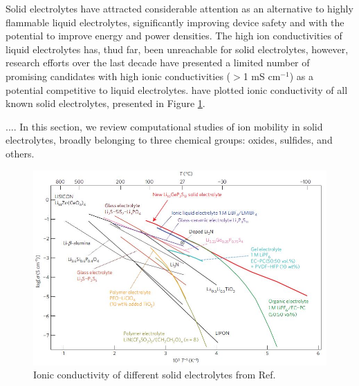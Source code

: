 \documentclass[journal=jacsat,manuscript=article]{achemso}
\begin{document}
Solid electrolytes have attracted considerable attention as an alternative to highly flammable liquid electrolytes, significantly improving device safety and with the potential to improve energy and power densities. \cite{janek_solid_2016, culver_designing_2018, famprikis_fundamentals_2019, goodenough_li-ion_2013} The high ion conductivities of liquid electrolytes has, thud far, been unreachable for solid electrolytes, however, research efforts over the last decade have presented a limited number of promising candidates with high ionic conductivities ($>$1 mS cm$^{-1}$) as a potential competitive to liquid electrolytes.\cite{kanno_synthesis_2000,murayama_synthesis_2002,murayama_material_2004,minafra_influence_2019,bron_li_2013,whiteley_empowering_2014,huang_superionic_2019,yamane_crystal_2007,homma_crystal_2011} \citeauthor{Kamaya2011} have plotted ionic conductivity of all known solid electrolytes, presented in Figure \ref{fig:solid-electrolyte}. \cite{Kamaya2011} 

.... In this section, we review computational studies of ion mobility in solid electrolytes, broadly belonging to three chemical groups: oxides, sulfides, and others.


\begin{figure}[h]
    \centering
    \includegraphics[scale=0.65]{figures/kamaya.jpg}
    \caption{Ionic conductivity of different solid electrolytes from Ref. }
    \label{fig:solid-electrolyte}
\end{figure}
\clearpage
\end{document}
